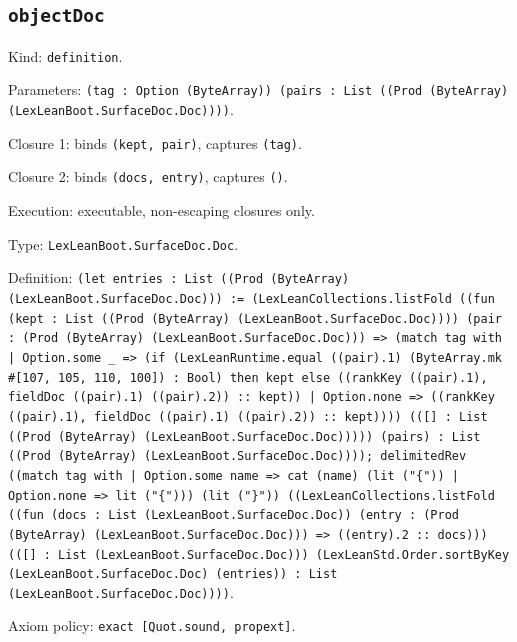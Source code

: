 \documentclass[11pt]{article}
\begin{document}
\subsection*{\texttt{objectDoc}}
\noindent Kind: \texttt{definition}.\par
\noindent Parameters: \texttt{(tag : Option (ByteArray)) (pairs : List ((Prod (ByteArray) (LexLeanBoot.SurfaceDoc.Doc))))}.\par
\noindent Closure 1: binds \texttt{(kept, pair)}, captures \texttt{(tag)}.\par
\noindent Closure 2: binds \texttt{(docs, entry)}, captures \texttt{()}.\par
\noindent Execution: executable, non-escaping closures only.\par
\noindent Type: \texttt{LexLeanBoot.SurfaceDoc.Doc}.\par
\noindent Definition: \texttt{(let entries : List ((Prod (ByteArray) (LexLeanBoot.SurfaceDoc.Doc))) := (LexLeanCollections.listFold ((fun (kept : List ((Prod (ByteArray) (LexLeanBoot.SurfaceDoc.Doc)))) (pair : (Prod (ByteArray) (LexLeanBoot.SurfaceDoc.Doc))) => (match tag with | Option.some \_ => (if (LexLeanRuntime.equal ((pair).1) (ByteArray.mk \#[107, 105, 110, 100]) : Bool) then kept else ((rankKey ((pair).1), fieldDoc ((pair).1) ((pair).2)) :: kept)) | Option.none => ((rankKey ((pair).1), fieldDoc ((pair).1) ((pair).2)) :: kept)))) (([] : List ((Prod (ByteArray) (LexLeanBoot.SurfaceDoc.Doc))))) (pairs) : List ((Prod (ByteArray) (LexLeanBoot.SurfaceDoc.Doc)))); delimitedRev ((match tag with | Option.some name => cat (name) (lit ("\{")) | Option.none => lit ("\{"))) (lit ("\}")) ((LexLeanCollections.listFold ((fun (docs : List (LexLeanBoot.SurfaceDoc.Doc)) (entry : (Prod (ByteArray) (LexLeanBoot.SurfaceDoc.Doc))) => ((entry).2 :: docs))) (([] : List (LexLeanBoot.SurfaceDoc.Doc))) (LexLeanStd.Order.sortByKey (LexLeanBoot.SurfaceDoc.Doc) (entries)) : List (LexLeanBoot.SurfaceDoc.Doc))))}.\par
\noindent Axiom policy: \texttt{exact [Quot.sound, propext]}.\par
\end{document}
